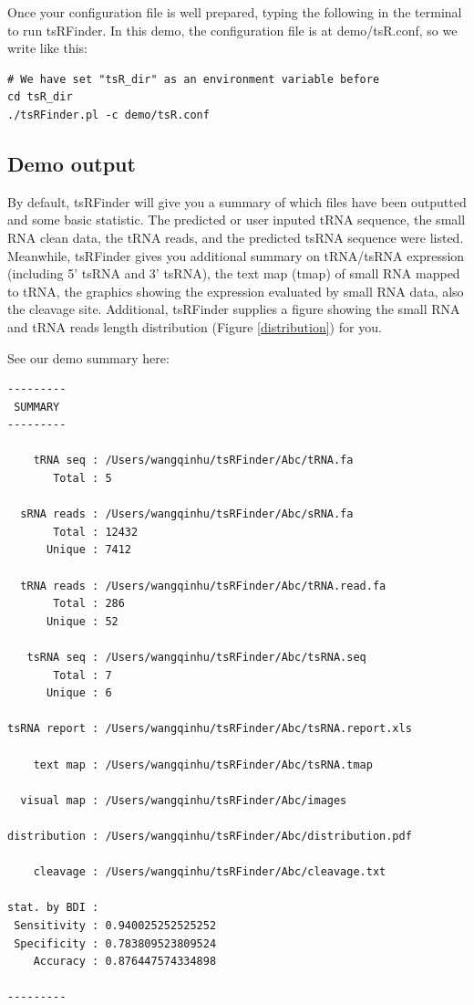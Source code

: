 \documentclass[11pt, a4paper]{article}
\begin{document}
Once your configuration file is well prepared, typing the following in the terminal to run tsRFinder. In this demo, the configuration file is at demo/tsR.conf, so we write like this:

\begin{verbatim}
# We have set "tsR_dir" as an environment variable before
cd tsR_dir
./tsRFinder.pl -c demo/tsR.conf
\end{verbatim}

\subsection{Demo output}

By default, tsRFinder will give you a summary of which files have been outputted and some basic statistic. The predicted or user inputed tRNA sequence, the small RNA clean data, the tRNA reads, and the predicted tsRNA sequence were listed. Meanwhile, tsRFinder gives you additional summary on tRNA/tsRNA expression (including 5' tsRNA and 3' tsRNA), the text map (tmap) of small RNA mapped to tRNA, the graphics showing the expression evaluated by small RNA data, also the cleavage site. Additional, tsRFinder supplies a figure showing the small RNA and tRNA reads length distribution (Figure \ref{distribution}) for you.

See our demo summary here:

{\small \begin{verbatim}
---------
 SUMMARY 
---------

    tRNA seq : /Users/wangqinhu/tsRFinder/Abc/tRNA.fa
       Total : 5

  sRNA reads : /Users/wangqinhu/tsRFinder/Abc/sRNA.fa
       Total : 12432
      Unique : 7412

  tRNA reads : /Users/wangqinhu/tsRFinder/Abc/tRNA.read.fa
       Total : 286
      Unique : 52

   tsRNA seq : /Users/wangqinhu/tsRFinder/Abc/tsRNA.seq
       Total : 7
      Unique : 6

tsRNA report : /Users/wangqinhu/tsRFinder/Abc/tsRNA.report.xls

    text map : /Users/wangqinhu/tsRFinder/Abc/tsRNA.tmap

  visual map : /Users/wangqinhu/tsRFinder/Abc/images

distribution : /Users/wangqinhu/tsRFinder/Abc/distribution.pdf

    cleavage : /Users/wangqinhu/tsRFinder/Abc/cleavage.txt

stat. by BDI :
 Sensitivity : 0.940025252525252
 Specificity : 0.783809523809524
    Accuracy : 0.876447574334898

---------
\end{verbatim}
}
\end{document}
